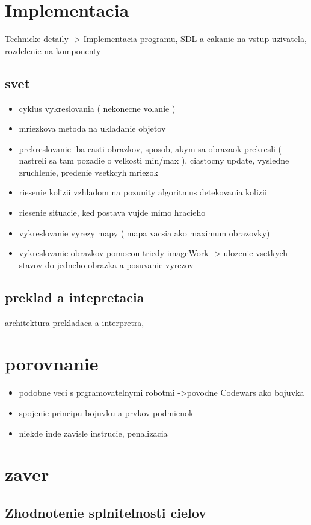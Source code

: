 \documentclass[12pt,notitlepage]{report}
\begin{document}
\chapter{Implementacia}
Technicke detaily -> Implementacia programu, SDL a cakanie na vstup uzivatela, rozdelenie na komponenty
\section{svet}
\begin{itemize}
\item cyklus vykreslovania ( nekonecne volanie )
\item mriezkova metoda na ukladanie objetov
\item prekreslovanie iba casti obrazkov, sposob, akym  sa obrazaok prekresli ( nastreli sa tam pozadie o velkosti min/max ), ciastocny update, vysledne zruchlenie, predenie vsetkcyh mriezok
\item riesenie kolizii vzhladom na pozuuity algoritmus detekovania kolizii
\item riesenie situacie, ked postava vujde mimo hracieho
\item vykreslovanie vyrezy mapy ( mapa vacsia ako maximum obrazovky)
\item vykreslovanie obrazkov pomocou triedy imageWork -> ulozenie vsetkych stavov do jedneho obrazka a posuvanie vyrezov
\end{itemize}
\section{preklad a intepretacia}
architektura prekladaca a interpretra, 
\nopagebreak
\chapter{porovnanie}
\begin{itemize}
\item podobne veci s prgramovatelnymi robotmi ->povodne Codewars ako bojuvka
\item spojenie principu bojuvku a prvkov podmienok
\item niekde inde zavisle instrucie, penalizacia
\end{itemize}
\chapter{zaver}
\section{Zhodnotenie splnitelnosti cielov}
\end{document}
